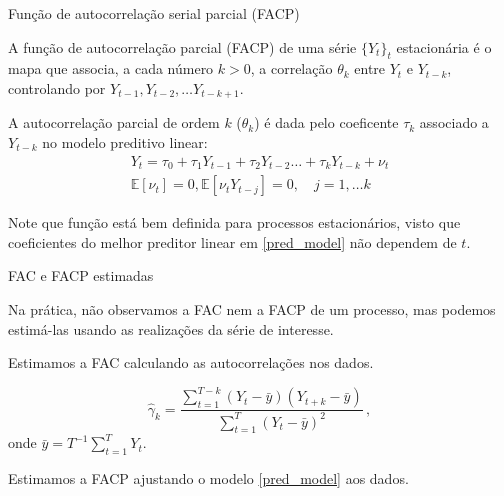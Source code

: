 \documentclass[11pt]{beamer}
\newenvironment{halfwideitemize}{\itemize\addtolength{\itemsep}{0.5em}}{\enditemize}
\begin{document}
\begin{frame}{Função de autocorrelação serial parcial (FACP)}
	\begin{halfwideitemize}
		\item A {\color{blue}função de autocorrelação parcial (FACP)} de uma série $\{Y_t\}_t$ estacionária é o mapa que associa, a cada número $k > 0$, a correlação $\theta_k$ entre $Y_{t}$ e $Y_{t-k}$, {\color{blue}controlando por $Y_{t-1}, Y_{t-2}, \ldots Y_{t-k+1}$}.

	
		

	
		\item A autocorrelação parcial de ordem $k$ ($\theta_k$) é dada pelo coeficente $\tau_k$ associado a $Y_{t-k}$ no modelo preditivo linear:
	\begin{equation}
		\label{pred_model}
		\begin{aligned}
			Y_t = \tau_0 + \tau_1 Y_{t-1} + \tau_2 Y_{t-2} \ldots + \tau_k Y_{t-k} + \nu_t \\
			\mathbb{E}[\nu_t] = 0, \mathbb{E}[\nu_t Y_{t-j}] = 0,\quad j=1,\ldots k
		\end{aligned}
	\end{equation}
	\item Note que função está bem definida para processos estacionários, visto que coeficientes do melhor preditor linear em \eqref{pred_model} não dependem de $t$.
		\end{halfwideitemize}
\end{frame}
\begin{frame}{FAC e FACP estimadas}
	\begin{halfwideitemize}
		\item Na prática, não observamos a FAC nem a FACP de um processo, mas podemos estimá-las usando as realizações da série de interesse.
		\begin{halfwideitemize}
			\item Estimamos a FAC calculando as autocorrelações nos dados.
			
			$$\hat{\gamma}_k = \frac{\sum_{t=1}^{T-k} (Y_{t}-\bar{y})(Y_{t+k}-\bar{y})}{\sum_{t=1}^{T}(Y_t-\bar{y})^2} \, ,$$
			onde $\bar{y} = T^{-1}\sum_{t=1}^T Y_t$.
			\item Estimamos a FACP ajustando o modelo \eqref{pred_model} aos dados.
		\end{halfwideitemize}
	
	\end{halfwideitemize}
\end{frame}
\end{document}
